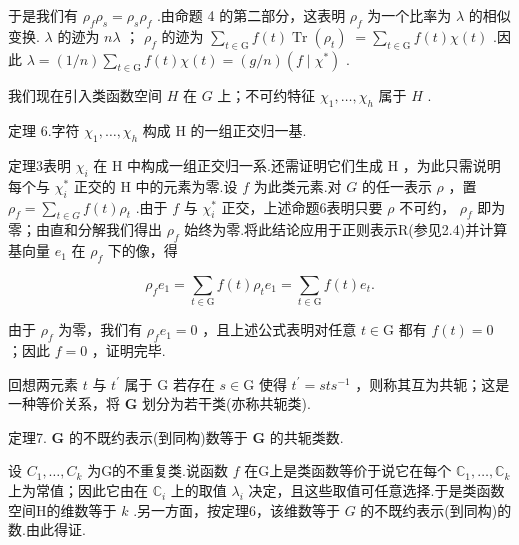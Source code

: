 于是我们有 \({\rho }_{f}{\rho }_{s} = {\rho }_{s}{\rho }_{f}\) .由命题 4 的第二部分，这表明 \({\rho }_{f}\) 为一个比率为 \(\lambda\) 的相似变换. \(\lambda\) 的迹为 \({n\lambda }\) ； \({\rho }_{f}\) 的迹为 \(\mathop{\sum }\limits_{{t \in  \mathrm{G}}}f\left( t\right) \operatorname{Tr}\left( {\rho }_{t}\right) \; = \mathop{\sum }\limits_{{t \in  \mathrm{G}}}f\left( t\right) \chi \left( t\right)\) .因此 \(\lambda  = \left( {1/n}\right) \mathop{\sum }\limits_{{t \in  \mathrm{G}}}f\left( t\right) \chi \left( t\right)  = \left( {g/n}\right) \left( {f \mid  {\chi }^{ * }}\right)\) .

我们现在引入类函数空间 \(H\) 在 \(G\) 上；不可约特征 \({\chi }_{1},\ldots ,{\chi }_{h}\) 属于 \(H\) .

定理 6.字符 \({\chi }_{1},\ldots ,{\chi }_{h}\) 构成 \(\mathrm{H}\) 的一组正交归一基.

定理3表明 \({\chi }_{i}\) 在 \(\mathrm{H}\) 中构成一组正交归一系.还需证明它们生成 \(\mathrm{H}\) ，为此只需说明每个与 \({\chi }_{i}^{ * }\) 正交的 \(\mathrm{H}\) 中的元素为零.设 \(f\) 为此类元素.对 \(G\) 的任一表示 \(\rho\) ，置 \({\rho }_{f} = \mathop{\sum }\limits_{{t \in  G}}f\left( t\right) {\rho }_{t}\) .由于 \(f\) 与 \({\chi }_{i}^{ * }\) 正交，上述命题6表明只要 \(\rho\) 不可约， \({\rho }_{f}\) 即为零；由直和分解我们得出 \({\rho }_{f}\) 始终为零.将此结论应用于正则表示R(参见2.4)并计算基向量 \({e}_{1}\) 在 \({\rho }_{f}\) 下的像，得

\[
{\rho }_{f}{e}_{1} = \mathop{\sum }\limits_{{t \in  \mathrm{G}}}f\left( t\right) {\rho }_{t}{e}_{1} = \mathop{\sum }\limits_{{t \in  \mathrm{G}}}f\left( t\right) {e}_{t}.
\]

由于 \({\rho }_{f}\) 为零，我们有 \({\rho }_{f}{e}_{1} = 0\) ，且上述公式表明对任意 \(t \in  \mathrm{G}\) 都有 \(f\left( t\right)  = 0\) ；因此 \(f = 0\) ，证明完毕.

回想两元素 \(t\) 与 \({t}^{\prime }\) 属于 \(\mathrm{G}\) 若存在 \(s \in  \mathrm{G}\) 使得 \({t}^{\prime } = {st}{s}^{-1}\) ，则称其互为共轭；这是一种等价关系，将 \(\mathbf{G}\) 划分为若干类(亦称共轭类).

定理7. \(\mathbf{G}\) 的不既约表示(到同构)数等于 \(\mathbf{G}\) 的共轭类数.

设 \({C}_{1},\ldots ,{C}_{k}\) 为G的不重复类.说函数 \(f\) 在G上是类函数等价于说它在每个 \({\mathbb{C}}_{1},\ldots ,{\mathbb{C}}_{k}\) 上为常值；因此它由在 \({\mathbb{C}}_{i}\) 上的取值 \({\lambda }_{i}\) 决定，且这些取值可任意选择.于是类函数空间H的维数等于 \(k\) .另一方面，按定理6，该维数等于 \(G\) 的不既约表示(到同构)的数.由此得证.

